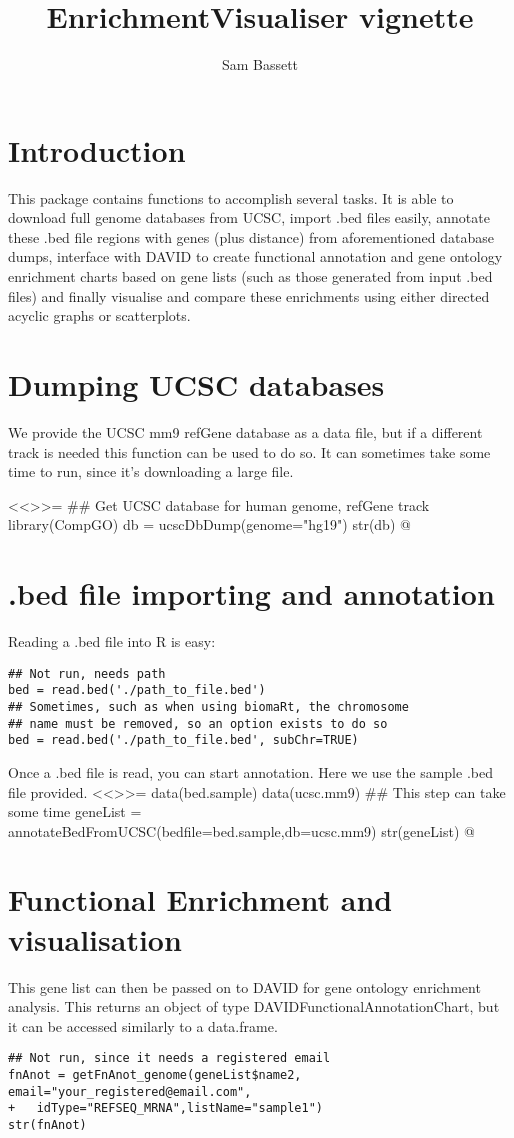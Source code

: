 \documentclass[11pt, oneside]{article}
\title{EnrichmentVisualiser vignette}
\author{Sam Bassett}
\affil{Developmental and Stem Cell Biology Lab,\\Victor Chang Cardiac Research Institute,\\Darlinghurst, Sydney, Australia}
\date{}
\begin{document}
\maketitle
\section{Introduction}
This package contains functions to accomplish several tasks. It is able to download full genome databases from UCSC, import .bed files easily, annotate these .bed file regions with genes (plus distance) from aforementioned database dumps, interface with DAVID to create functional annotation and gene ontology enrichment charts based on gene lists (such as those generated from input .bed files) and finally visualise and compare these enrichments using either directed acyclic graphs or scatterplots.

\section{Dumping UCSC databases}
We provide the UCSC mm9 refGene database as a data file, but if a different track is needed this function can be used to do so. It can sometimes take some time to run, since it's downloading a large file.

<<>>=
## Get UCSC database for human genome, refGene track
library(CompGO)
db = ucscDbDump(genome="hg19")
str(db)
@

\section{.bed file importing and annotation}
Reading a .bed file into R is easy:
\begin{verbatim}
## Not run, needs path
bed = read.bed('./path_to_file.bed')
## Sometimes, such as when using biomaRt, the chromosome
## name must be removed, so an option exists to do so
bed = read.bed('./path_to_file.bed', subChr=TRUE)
\end{verbatim}
Once a .bed file is read, you can start annotation. Here we use the sample .bed file provided.
<<>>=
data(bed.sample)
data(ucsc.mm9)
## This step can take some time
geneList = annotateBedFromUCSC(bedfile=bed.sample,db=ucsc.mm9)
str(geneList)
@

\section{Functional Enrichment and visualisation}
This gene list can then be passed on to DAVID for gene ontology enrichment analysis. This returns an object of type DAVIDFunctionalAnnotationChart, but it can be accessed similarly to a data.frame.
\begin{verbatim}
## Not run, since it needs a registered email
fnAnot = getFnAnot_genome(geneList$name2, email="your_registered@email.com",
+	idType="REFSEQ_MRNA",listName="sample1")
str(fnAnot)
\end{verbatim}
\end{document}
